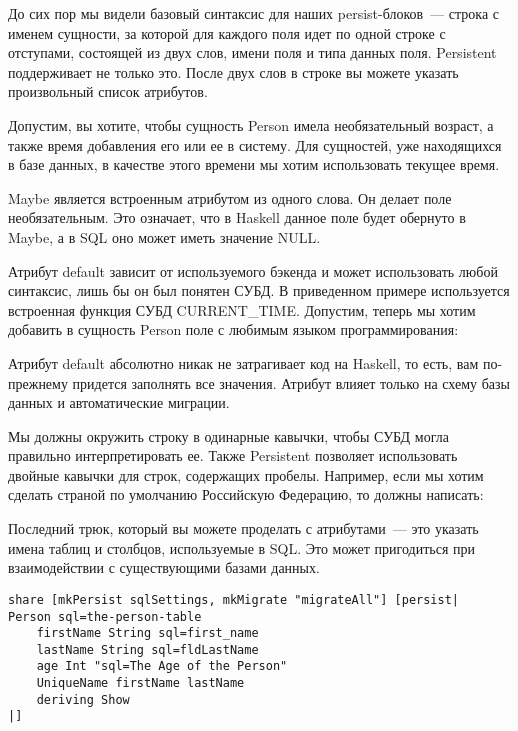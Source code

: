 До сих пор мы видели базовый синтаксис для наших persist-блоков~--- строка с именем сущности, за которой для каждого поля идет по одной строке с отступами, состоящей из двух слов, имени поля и типа данных поля. Persistent поддерживает не только это. После двух слов в строке вы можете указать произвольный список атрибутов.

Допустим, вы хотите, чтобы сущность Person имела необязательный возраст, а также время добавления его или ее в систему. Для сущностей, уже находящихся в базе данных, в качестве этого времени мы хотим использовать текущее время.


Maybe является встроенным атрибутом из одного слова. Он делает поле необязательным. Это означает, что в Haskell данное поле будет обернуто в Maybe, а в SQL оно может иметь значение NULL.

Атрибут default зависит от используемого бэкенда и может использовать любой синтаксис, лишь бы он был понятен СУБД. В приведенном примере используется встроенная функция СУБД CURRENT\_TIME. Допустим, теперь мы хотим добавить в сущность Person поле с любимым языком программирования:


\begin{remark}
Атрибут default абсолютно никак не затрагивает код на Haskell, то есть, вам по-прежнему придется заполнять все значения. Атрибут влияет только на схему базы данных и автоматические миграции.
\end{remark}

Мы должны окружить строку в одинарные кавычки, чтобы СУБД могла правильно интерпретировать ее. Также Persistent позволяет использовать двойные кавычки для строк, содержащих пробелы. Например, если мы хотим сделать страной по умолчанию Российскую Федерацию, то должны написать:


Последний трюк, который вы можете проделать с атрибутами~--- это указать имена таблиц и столбцов, используемые в SQL. Это может пригодиться при взаимодействии с существующими базами данных.

\begin{lstlisting}
share [mkPersist sqlSettings, mkMigrate "migrateAll"] [persist|
Person sql=the-person-table
    firstName String sql=first_name
    lastName String sql=fldLastName
    age Int "sql=The Age of the Person"
    UniqueName firstName lastName
    deriving Show
|]
\end{lstlisting}%

